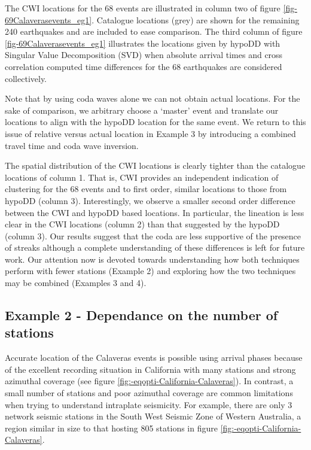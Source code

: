 \documentclass[extra]{gji}
\begin{document}
The CWI locations for the 68 events are illustrated in column two of
figure \ref{fig-69Calaverasevents_eg1}. Catalogue locations (grey)
are shown for the remaining 240 earthquakes and are included to ease
comparison. The third column of figure
\ref{fig-69Calaverasevents_eg1} illustrates the locations given by
hypoDD with Singular Value Decomposition (SVD) when absolute arrival
times and cross correlation computed time differences for the 68
earthquakes are considered collectively.

Note that by using coda waves alone we can not obtain actual
locations. For the sake of comparison, we arbitrary choose a
`master' event and translate our locations to align with the hypoDD
location for the same event. We return to this issue of relative
versus actual location in Example 3 by introducing a combined travel
time and coda wave inversion.

The spatial distribution of the CWI locations is clearly tighter
than the catalogue locations of column 1. That is, CWI provides an
independent indication of clustering for the 68 events and to first
order, similar locations to those from hypoDD (column 3).
Interestingly, we observe a smaller second order difference between
the CWI and hypoDD based locations. In particular, the lineation is
less clear in the CWI locations (column 2) than that suggested by
the hypoDD (column 3). Our results suggest that the coda are less
supportive of the presence of streaks although a complete
understanding of these differences is left for future work. Our
attention now is devoted towards understanding how both techniques
perform with fewer stations (Example 2) and exploring how the two
techniques may be combined (Examples 3 and 4).


\subsection{Example 2 - Dependance on the number of stations}


Accurate location of the Calaveras events is possible using arrival
phases because of the excellent recording situation in California
with many stations and strong azimuthal coverage (see figure
\ref{fig:-eqopti-California-Calaveras}). In contrast, a small number
of stations and poor azimuthal coverage are common limitations when
trying to understand intraplate seismicity. For example, there are
only 3 network seismic stations in the South West Seismic Zone of
Western Australia, a region similar in size to that hosting 805
stations in figure \ref{fig:-eqopti-California-Calaveras}.
\end{document}
